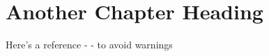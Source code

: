 \chapter{Another Chapter Heading}
\label{cha:chapter2}

\blindtext[2]

Here's a reference - \cite{John_Doe} - to avoid warnings